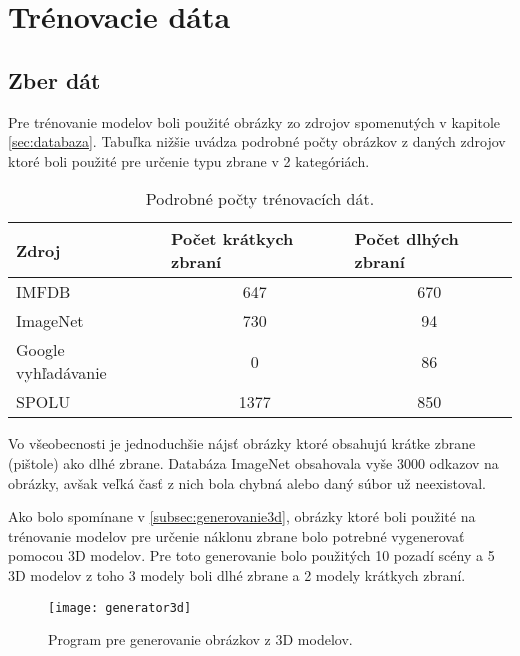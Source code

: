 
\section{Trénovacie dáta}
\label{sec:trenovaciedata}

\subsection{Zber dát}
Pre trénovanie modelov boli použité obrázky zo zdrojov spomenutých v kapitole \ref{sec:databaza}.
Tabuľka nižšie uvádza podrobné počty obrázkov z daných zdrojov ktoré boli použité pre určenie typu zbrane v 2 kategóriách.

\begin{table}[H]
  \centering
  \label{my-label}
  \begin{tabular}{|l|c|c|}
    \hline
    Zdroj               & \multicolumn{1}{l|}{Počet krátkych zbraní} & \multicolumn{1}{l|}{Počet dlhých zbraní} \\ \hline
    IMFDB               & 647                                        & 670                                      \\ \hline
    ImageNet            & 730                                        & 94                                       \\ \hline
    Google vyhľadávanie & 0                                          & 86                                       \\ \hline \hline
    SPOLU               & 1377                                       & 850                                      \\ \hline
  \end{tabular}
  \caption{Podrobné počty trénovacích dát.}
\end{table}

Vo všeobecnosti je jednoduchšie nájsť obrázky ktoré obsahujú krátke zbrane (pištole) ako dlhé zbrane.
Databáza ImageNet obsahovala vyše 3000 odkazov na obrázky, avšak veľká časť z nich bola chybná alebo daný súbor už neexistoval.

Ako bolo spomínane v \ref{subsec:generovanie3d}, obrázky ktoré boli použité na trénovanie modelov pre určenie náklonu zbrane bolo potrebné
    vygenerovať pomocou 3D modelov.
Pre toto generovanie bolo použitých 10 pozadí scény a 5 3D modelov z toho 3 modely boli dlhé zbrane a 2 modely krátkych zbraní.

\begin{figure}[H]
    \centering
    \texttt{[image: generator3d]}
    \caption{Program pre generovanie obrázkov z 3D modelov.}
    \label{pic:generator3d}
\end{figure}

